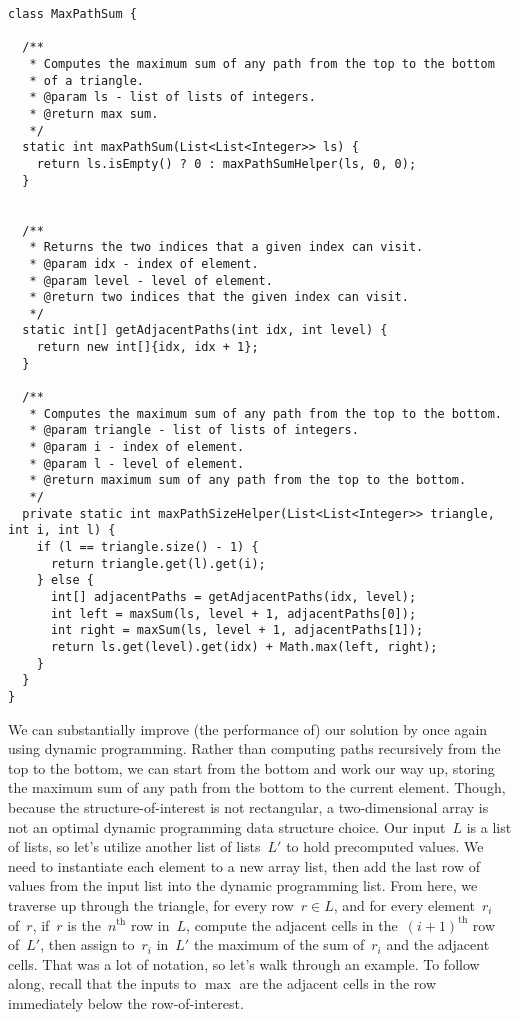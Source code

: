 \begin{lstlisting}[language=MyJava]
class MaxPathSum {

  /**
   * Computes the maximum sum of any path from the top to the bottom
   * of a triangle.
   * @param ls - list of lists of integers. 
   * @return max sum.
   */
  static int maxPathSum(List<List<Integer>> ls) {
    return ls.isEmpty() ? 0 : maxPathSumHelper(ls, 0, 0);
  }


  /**
   * Returns the two indices that a given index can visit.
   * @param idx - index of element.
   * @param level - level of element.
   * @return two indices that the given index can visit.
   */
  static int[] getAdjacentPaths(int idx, int level) {
    return new int[]{idx, idx + 1};
  }

  /**
   * Computes the maximum sum of any path from the top to the bottom.
   * @param triangle - list of lists of integers.
   * @param i - index of element.
   * @param l - level of element.
   * @return maximum sum of any path from the top to the bottom.
   */
  private static int maxPathSizeHelper(List<List<Integer>> triangle, int i, int l) {
    if (l == triangle.size() - 1) {
      return triangle.get(l).get(i);
    } else {
      int[] adjacentPaths = getAdjacentPaths(idx, level);
      int left = maxSum(ls, level + 1, adjacentPaths[0]);
      int right = maxSum(ls, level + 1, adjacentPaths[1]);
      return ls.get(level).get(idx) + Math.max(left, right);
    }
  }
}
\end{lstlisting}

We can substantially improve (the performance of) our solution by once again using dynamic programming.
Rather than computing paths recursively from the top to the bottom, we can start from the bottom and work our way up, storing the maximum sum of any path from the bottom to the current element.
Though, because the structure-of-interest is not rectangular, a two-dimensional array is not an optimal dynamic programming data structure choice.
Our input~$L$ is a list of lists, so let's utilize another list of lists~$L'$ to hold precomputed values.
We need to instantiate each element to a new array list, then add the last row of values from the input list into the dynamic programming list. 
From here, we traverse up through the triangle, for every row~$r\in{L}$, and for every element~$r_i$ of~$r$, if~$r$ is the~$n^\text{th}$ row in~$L$, compute the adjacent cells in the~$(i+1)^\text{th}$ row of~$L'$, then assign to~$r_i$ in~$L'$ the maximum of the sum of~$r_i$ and the adjacent cells.
That was a lot of notation, so let's walk through an example. To follow along, recall that the inputs to $\max$ are the adjacent cells in the row immediately below the row-of-interest.

